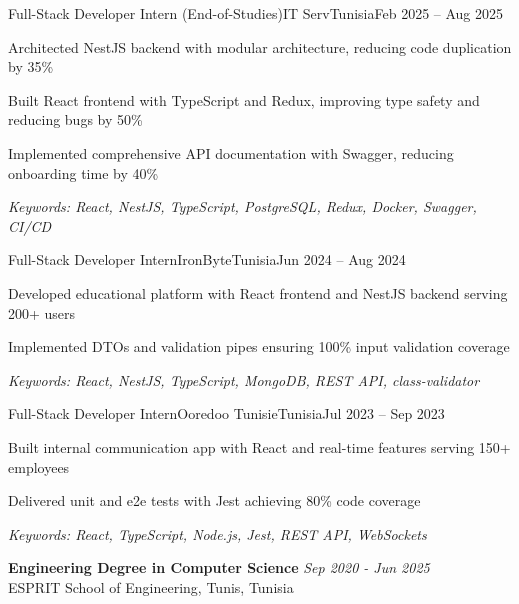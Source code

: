 \documentclass[11pt,a4paper]{article}
\begin{document}
\makecvheader
\makecontactinfo


\begin{internship}{Full-Stack Developer Intern (End-of-Studies)}{IT Serv}{Tunisia}{Feb 2025 -- Aug 2025}{}
  \item Architected NestJS backend with modular architecture, reducing code duplication by 35\%
  \item Built React frontend with TypeScript and Redux, improving type safety and reducing bugs by 50\%
  \item Implemented comprehensive API documentation with Swagger, reducing onboarding time by 40\%
  \item[] \textit{\footnotesize Keywords: React, NestJS, TypeScript, PostgreSQL, Redux, Docker, Swagger, CI/CD}
\end{internship}

\begin{internship}{Full-Stack Developer Intern}{IronByte}{Tunisia}{Jun 2024 -- Aug 2024}{}
  \item Developed educational platform with React frontend and NestJS backend serving 200+ users
  \item Implemented DTOs and validation pipes ensuring 100\% input validation coverage
  \item[] \textit{\footnotesize Keywords: React, NestJS, TypeScript, MongoDB, REST API, class-validator}
\end{internship}

\begin{internship}{Full-Stack Developer Intern}{Ooredoo Tunisie}{Tunisia}{Jul 2023 -- Sep 2023}{}
  \item Built internal communication app with React and real-time features serving 150+ employees
  \item Delivered unit and e2e tests with Jest achieving 80\% code coverage
  \item[] \textit{\footnotesize Keywords: React, TypeScript, Node.js, Jest, REST API, WebSockets}
\end{internship}

\textbf{Engineering Degree in Computer Science} \hfill \textit{Sep 2020 - Jun 2025}\\[-2pt]
ESPRIT School of Engineering, Tunis, Tunisia
\end{document}
